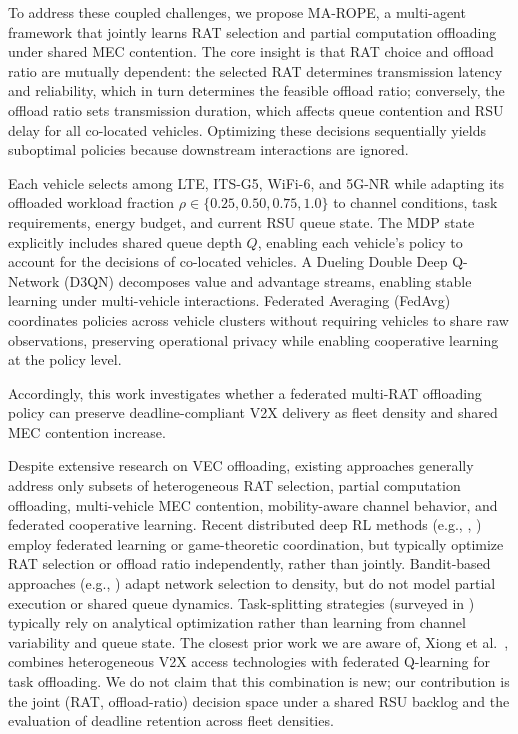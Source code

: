 \documentclass[journal,10pt,twocolumn]{IEEEtran}
\begin{document}
To address these coupled challenges, we propose MA-ROPE, a multi-agent framework that jointly learns RAT selection and partial computation offloading under shared MEC contention. The core insight is that RAT choice and offload ratio are mutually dependent: the selected RAT determines transmission latency and reliability, which in turn determines the feasible offload ratio; conversely, the offload ratio sets transmission duration, which affects queue contention and RSU delay for all co-located vehicles. Optimizing these decisions sequentially yields suboptimal policies because downstream interactions are ignored.

Each vehicle selects among LTE, ITS-G5, WiFi-6, and 5G-NR while adapting its offloaded workload fraction $\rho \in \{0.25, 0.50, 0.75, 1.0\}$ to channel conditions, task requirements, energy budget, and current RSU queue state. The MDP state explicitly includes shared queue depth $Q$, enabling each vehicle's policy to account for the decisions of co-located vehicles. A Dueling Double Deep Q-Network (D3QN) decomposes value and advantage streams, enabling stable learning under multi-vehicle interactions. Federated Averaging (FedAvg) coordinates policies across vehicle clusters without requiring vehicles to share raw observations, preserving operational privacy while enabling cooperative learning at the policy level.

Accordingly, this work investigates whether a federated multi-RAT offloading policy can preserve deadline-compliant V2X delivery as fleet density and shared MEC contention increase.

Despite extensive research on VEC offloading, existing approaches generally address only subsets of heterogeneous RAT selection, partial computation offloading, multi-vehicle MEC contention, mobility-aware channel behavior, and federated cooperative learning. Recent distributed deep RL methods (e.g., \cite{zhao2024}, \cite{guo2026}) employ federated learning or game-theoretic coordination, but typically optimize RAT selection or offload ratio independently, rather than jointly. Bandit-based approaches (e.g., \cite{haq2026}) adapt network selection to density, but do not model partial execution or shared queue dynamics. Task-splitting strategies (surveyed in \cite{mach2017}) typically rely on analytical optimization rather than learning from channel variability and queue state. The closest prior work we are aware of, Xiong et al.~\cite{xiong2021}, combines heterogeneous V2X access technologies with federated Q-learning for task offloading. We do not claim that this combination is new; our contribution is the joint (RAT, offload-ratio) decision space under a shared RSU backlog and the evaluation of deadline retention across fleet densities.
\end{document}

